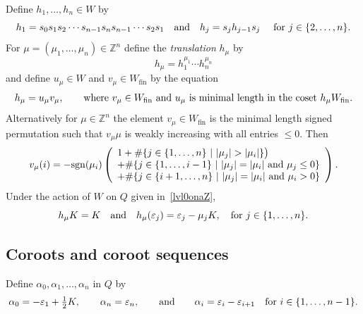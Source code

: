 \documentclass[11pt]{article}
\theoremstyle{plain}
\theoremstyle{definition}
\theoremstyle{remark}
\numberwithin{equation}{section}
\def\ZZ{\mathbb{Z}}
\newcounter{r}
\newcounter{s}
\begin{document}
Define $h_1, \ldots, h_n\in W$ by
$$h_1 = s_0s_1s_2\cdots s_{n-1}s_ns_{n-1}\cdots s_2s_1
\quad\hbox{and}\quad
h_j = s_jh_{j-1}s_j\ \quad \hbox{for $j\in \{2, \ldots, n\}$.}
$$
For $\mu=(\mu_1, \ldots, \mu_n)\in \ZZ^n$ define the \emph{translation} $h_\mu$ by
$$h_\mu = h_1^{\mu_1}\cdots h_n^{\mu_n}$$
and define $u_\mu\in W$ and $v_\mu\in W_{\mathrm{fin}}$ by the equation
\begin{equation}
h_\mu = u_\mu v_\mu, \qquad
\hbox{where $v_\mu\in W_{\mathrm{fin}}$ and $u_\mu$ is minimal length in the coset $h_\mu W_{\mathrm{fin}}$.}
\label{uvmudef}
\end{equation}
Alternatively for $\mu\in \ZZ^n$ the element $v_\mu\in W_{\mathrm{fin}}$ is the minimal length signed permutation such that $v_\mu \mu$ is weakly increasing with all entries $\le 0$.  Then
\begin{equation}
v_\mu(i) = - \mathrm{sgn}(\mu_i)
\left(\begin{array}{l}
1
+ \#\{j \in \{1, \ldots, n\} \ |\ \vert \mu_{j} \vert > \vert \mu_i\vert \}\big) \\
+\#\{j \in \{1, \ldots, i-1\} \ |\ \hbox{$\vert \mu_{j}\vert = \vert \mu_i\vert$ and $\mu_j\le0$}  \}  \\
+\#\{j \in \{i+1, \ldots, n\} \ |\ \hbox{$\vert \mu_{j}\vert = \vert \mu_i\vert$ and $\mu_i>0$}  \}
\end{array}\right).
\label{vmuvals}
\end{equation}
Under the action of $W$ on $Q$ given in~\eqref{lvl0onaZ},
$$h_\mu K = K \quad\hbox{and}\quad
h_\mu(\varepsilon_j)
= \varepsilon_j - \mu_j K, \quad \hbox{for $j\in \{1, \ldots ,n\}$.}
$$



\subsection{Coroots and coroot sequences}

Define $\alpha_0, \alpha_1, \ldots, \alpha_n$ in $Q$ by
\begin{equation}
\alpha_0 = -\varepsilon_1 + \hbox{$\frac12$}K, \qquad
\alpha_n = \varepsilon_n, \qquad\hbox{and}\qquad
\alpha_i = \varepsilon_i - \varepsilon_{i+1} \quad\hbox{for $i\in \{1, \ldots, n-1\}$.}
\label{scoroots}
\end{equation}
\end{document}
